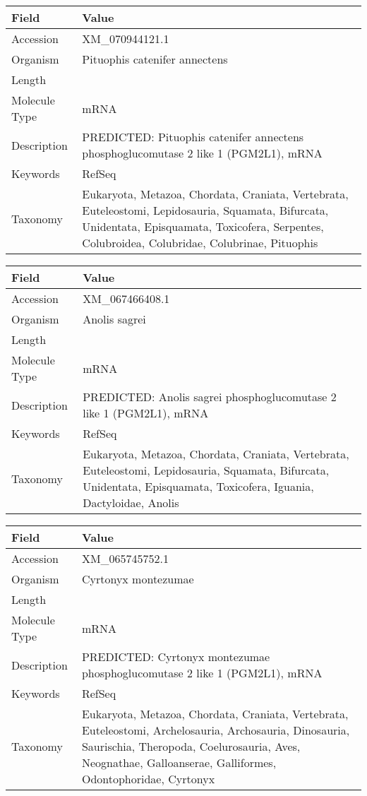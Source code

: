 \documentclass[10pt]{article}
\begin{document}
\vspace{1em}
{\footnotesize
\begin{longtable}{>{\raggedright\arraybackslash}p{4.5cm} >{\raggedright\arraybackslash}p{11.5cm}}
\textbf{Field} & \textbf{Value} \\
\hline
Accession & XM\_070944121.1 \\
Organism & Pituophis catenifer annectens \\
Length & 1948 \\
Molecule Type & mRNA \\
Description & PREDICTED: Pituophis catenifer annectens phosphoglucomutase 2 like 1 (PGM2L1), mRNA \\
Keywords & RefSeq \\
Taxonomy & Eukaryota, Metazoa, Chordata, Craniata, Vertebrata, Euteleostomi, Lepidosauria, Squamata, Bifurcata, Unidentata, Episquamata, Toxicofera, Serpentes, Colubroidea, Colubridae, Colubrinae, Pituophis \\
\end{longtable}
}

\vspace{1em}
{\footnotesize
\begin{longtable}{>{\raggedright\arraybackslash}p{4.5cm} >{\raggedright\arraybackslash}p{11.5cm}}
\textbf{Field} & \textbf{Value} \\
\hline
Accession & XM\_067466408.1 \\
Organism & Anolis sagrei \\
Length & 2795 \\
Molecule Type & mRNA \\
Description & PREDICTED: Anolis sagrei phosphoglucomutase 2 like 1 (PGM2L1), mRNA \\
Keywords & RefSeq \\
Taxonomy & Eukaryota, Metazoa, Chordata, Craniata, Vertebrata, Euteleostomi, Lepidosauria, Squamata, Bifurcata, Unidentata, Episquamata, Toxicofera, Iguania, Dactyloidae, Anolis \\
\end{longtable}
}

\vspace{1em}
{\footnotesize
\begin{longtable}{>{\raggedright\arraybackslash}p{4.5cm} >{\raggedright\arraybackslash}p{11.5cm}}
\textbf{Field} & \textbf{Value} \\
\hline
Accession & XM\_065745752.1 \\
Organism & Cyrtonyx montezumae \\
Length & 2112 \\
Molecule Type & mRNA \\
Description & PREDICTED: Cyrtonyx montezumae phosphoglucomutase 2 like 1 (PGM2L1), mRNA \\
Keywords & RefSeq \\
Taxonomy & Eukaryota, Metazoa, Chordata, Craniata, Vertebrata, Euteleostomi, Archelosauria, Archosauria, Dinosauria, Saurischia, Theropoda, Coelurosauria, Aves, Neognathae, Galloanserae, Galliformes, Odontophoridae, Cyrtonyx \\
\end{longtable}
}
\end{document}

